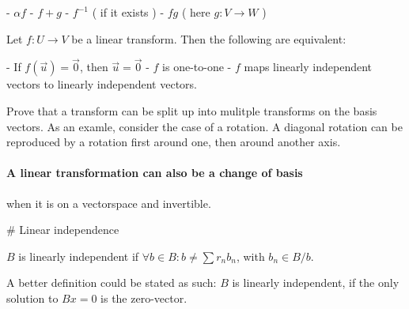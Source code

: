     - $\alpha f$
    - $f + g$
    - $f^{-1}$ ( if it exists )
    - $fg$ ( here $g: V \to W$ )


Let $f: U \to V$ be a linear transform. Then the following are equivalent: 

    - If $f(\vec{u}) = \vec{0}$, then $\vec{u} = \vec{0}$
    - $f$ is one-to-one
    - $f$ maps linearly independent vectors to linearly independent vectors. 



Prove that a transform can be split up into mulitple transforms on the basis vectors. 
As an examle, consider the case of a rotation. A diagonal rotation can be reproduced by a rotation first around one, then around another axis. 


\paragraph{A linear transformation can also be a change of basis} when it is on a vectorspace and invertible.














# Linear independence


\begin{definition}
    $B$ is linearly independent if $\forall b \in B: b \neq \sum r_n b_n$, with $b_n \in B/b$. 
\end{definition}

\begin{theorem} \label{lin_indep_if_no_bx0}
  A better definition could be stated as such: $B$ is linearly independent, if the only solution to $Bx = 0$ is the zero-vector.
\end{theorem}

